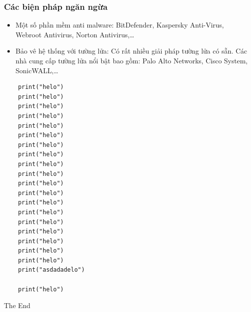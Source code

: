 \documentclass{beamer}
\begin{document}


\begin{frame}
\frametitle{Các biện pháp ngăn ngừa}
     \begin{itemize}
    \item Một số phần mềm anti malware: BitDefender, Kaspersky Anti-Virus, Webroot Antivirus, Norton Antivirus,…
    \item Bảo vê hệ thống với tường lửa:  Có rất nhiều giải pháp tường lửa có sẵn. Các nhà cung cấp tường lửa nổi bật bao gồm: Palo Alto Networks, Cisco System, SonicWALL,…
    
\end{itemize}

\end{frame}
\begin{frame}[fragile]
    \begin{verbatim}
    print("helo")
    print("helo")
    print("helo")
    print("helo")
    print("helo")
    print("helo")
    print("helo")
    print("helo")
    print("helo")
    print("helo")
    print("helo")
    print("helo")
    print("helo")
    print("helo")
    print("helo")
    print("helo")
    print("helo")
    print("helo")
    print("helo")
    print("asdadadelo")

    print("helo")

    \end{verbatim}
    \end{frame}






\begin{frame}
\Huge{\centerline{The End}}
\end{frame}

\end{document}

